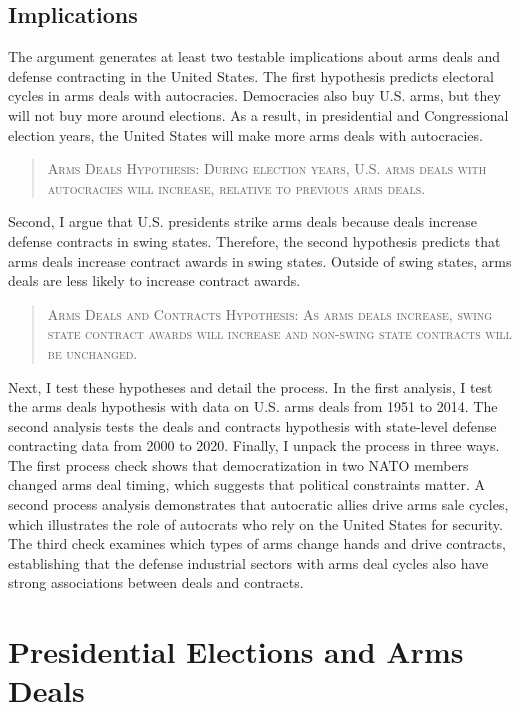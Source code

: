 \documentclass[12pt]{article}
\begin{document}
\subsection{Implications}


The argument generates at least two testable implications about arms deals and defense contracting in the United States. 
The first hypothesis predicts electoral cycles in arms deals with autocracies.
Democracies also buy U.S. arms, but they will not buy more around elections. 
As a result, in presidential and Congressional election years, the United States will make more arms deals with autocracies. 


\begin{quote}
\textsc{Arms Deals Hypothesis: During election years, U.S. arms deals with autocracies will increase, relative to previous arms deals.}
\end{quote}


Second, I argue that U.S. presidents strike arms deals because deals increase defense contracts in swing states.
Therefore, the second hypothesis predicts that arms deals increase contract awards in swing states.
Outside of swing states, arms deals are less likely to increase contract awards. 


\begin{quote}
\textsc{Arms Deals and Contracts Hypothesis: As arms deals increase, swing state contract awards will increase and non-swing state contracts will be unchanged.}
\end{quote}


Next, I test these hypotheses and detail the process. 
In the first analysis, I test the arms deals hypothesis with data on U.S. arms deals from 1951 to 2014.  
The second analysis tests the deals and contracts hypothesis with state-level defense contracting data from 2000 to 2020. 
Finally, I unpack the process in three ways.
The first process check shows that democratization in two NATO members changed arms deal timing, which suggests that political constraints matter. 
A second process analysis demonstrates that autocratic allies drive arms sale cycles, which illustrates the role of autocrats who rely on the United States for security. 
The third check examines which types of arms change hands and drive contracts, establishing that the defense industrial sectors with arms deal cycles also have strong associations between deals and contracts. 


\section{Presidential Elections and Arms Deals}
\end{document}
